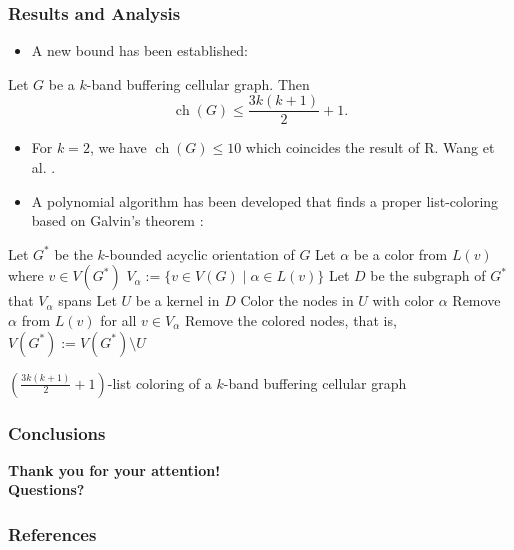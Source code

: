\documentclass{beamer} %
\DeclareMathOperator{\ch}{ch}
\begin{document}
\begin{frame}[allowframebreaks]
\frametitle{Results and Analysis}
\justifying
\begin{itemize}
\item A new bound has been established:
\end{itemize}
\begin{theorem} Let $G$ be a $k$-band buffering cellular graph. Then 
$$\ch(G) \leqslant \frac{3k(k+1)}{2} + 1.$$
\end{theorem}
\begin{itemize}
\item For $k=2$, we have $\ch(G) \leqslant 10$ which coincides the result of R. Wang et al. \cite{7248845}.
\item A polynomial algorithm has been developed that finds a proper list-coloring based on Galvin's theorem \cite{Galvin:1995:LCI:199352.199369}:
\end{itemize}

\begin{algorithm}[H]\label{alg:szekeres-list-coloring}
  Let $G^*$ be the $k$-bounded acyclic orientation of $G$\;
   {
  	Let $\alpha$ be a color from $L(v)$ where $v \in V(G^*)$\;
  	$V_\alpha := \lbrace v \in V(G) \mid \alpha \in L(v) \rbrace$\;
  	Let $D$ be the subgraph of $G^*$ that $V_\alpha$ spans\;
  	Let $U$ be a kernel in $D$\;
  	Color the nodes in $U$ with color $\alpha$\;
  	Remove $\alpha$ from $L(v)$ for all $v \in V_\alpha$\;
  	Remove the colored nodes, that is, $V(G^*) := V(G^*) \setminus U$\;
  }
 \caption{$\left(\frac{3k(k+1)}{2} + 1\right)$-list coloring of a $k$-band buffering cellular graph}
\end{algorithm}
\end{frame}

\begin{frame}
\frametitle{Conclusions}
\justifying
\end{frame}

\begin{frame}
\justifying
\center
\textbf{Thank you for your attention!\\ Questions?}
\end{frame}

\begin{frame}[allowframebreaks]
        \frametitle{References}
        
        
\end{frame}
\end{document}
